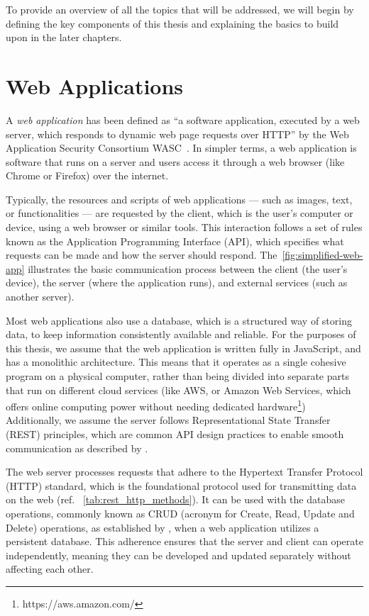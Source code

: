 
To provide an overview of all the topics that will be addressed, we will begin by defining the key components of this thesis and explaining the basics to build upon in the later chapters. 

\section{Web Applications}
\label{sec:webapp}
A \textit{web application} has been defined as “a software application, executed by a web server, which responds to dynamic web page requests over HTTP” by the Web Application Security Consortium WASC~\cite{noauthor_web_2012}. 
In simpler terms, a web application is software that runs on a server and users access it through a web browser (like Chrome or Firefox) over the internet.

Typically, the resources and scripts of web applications — such as images, text, or functionalities — are requested by the client, which is the user's computer or device, using a web browser or similar tools. This interaction follows a set of rules known as the Application Programming Interface (API), which specifies what requests can be made and how the server should respond.
The~\autoref{fig:simplified-web-app} illustrates the basic communication process between the client (the user's device), the server (where the application runs), and external services (such as another server).

Most web applications also use a database, which is a structured way of storing data, to keep information consistently available and reliable. For the purposes of this thesis, we assume that the web application is written fully in JavaScript, and has a monolithic architecture. This means that it operates as a single cohesive program on a physical computer, rather than being divided into separate parts that run on different cloud services (like AWS, or Amazon Web Services, which offers online computing power without needing dedicated hardware\footnote{https://aws.amazon.com/})
Additionally, we assume the server follows Representational State Transfer (REST) principles, which are common API design practices to enable smooth communication as described by \citet{roy_t_fielding_rest_2008}. 

The web server processes requests that adhere to the Hypertext Transfer Protocol (HTTP) standard, which is the foundational protocol used for transmitting data on the web (ref. ~\autoref{tab:rest_http_methods}). It can be used  with the database operations, commonly known as CRUD (acronym for Create, Read, Update and Delete)  operations, as established by \citet{martin_managing_1983}, when a web application utilizes a persistent database.
This adherence ensures that the server and client can operate independently, meaning they can be developed and updated separately without affecting each other\cite{fielding_http_2022}.



